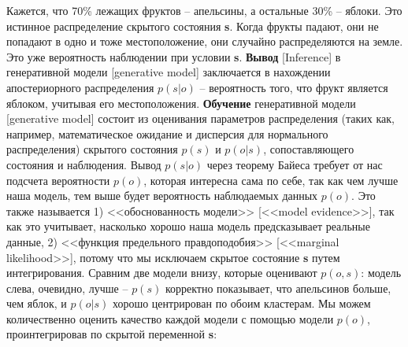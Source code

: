 \documentclass[twoside,leqno, 11pt]{article}
\begin{document}
	\begin{figure}[h]
		\label{ris:image}
	\end{figure}
	
	Кажется, что 70\% лежащих фруктов -- апельсины, а остальные 30\% -- яблоки. Это истинное распределение скрытого состояния \textbf{s}. Когда фрукты падают, они не попадают в одно и тоже местоположение, они случайно распределяются на земле. Это уже вероятность наблюдении при условии \textbf{s}. \textbf{Вывод} [Inference] в генеративной модели [generative model] заключается в нахождении апостериорного распределения $p(s|o)$ -- вероятность того, что фрукт является яблоком, учитывая его местоположения. \textbf{Обучение} генеративной модели [generative model] состоит из оценивания параметров распределения (таких как, например, математическое ожидание и дисперсия для нормального распределения) скрытого состояния $p(s)$ и $p(o|s)$, сопоставляющего состояния и наблюдения. Вывод $p(s|o)$ через теорему Байеса требует от нас подсчета вероятности $p(o)$, которая интересна сама по себе, так как чем лучше наша модель, тем выше будет вероятность наблюдаемых данных $p(o)$. Это также называется 1) <<обоснованность модели>> [<<model evidence>>], так как это учитывает, насколько хорошо наша модель предсказывает реальные данные, 2) <<функция предельного правдоподобия>> [<<marginal likelihood>>], потому что мы исключаем скрытое состояние \textbf{s} путем интегрирования.
	Сравним две модели внизу, которые оценивают $p(o,s)$: модель слева, очевидно, лучше -- $p(s)$ корректно показывает, что апельсинов больше, чем яблок, и $p(o|s)$ хорошо центрирован по обоим кластерам. Мы можем количественно оценить качество каждой модели с помощью модели $p(o)$, проинтегрировав по скрытой переменной \textbf{s}:
	
	\begin{figure}[h]
		\label{ris:image}
	\end{figure}
	
\end{document}
